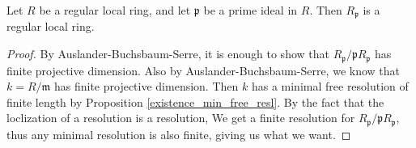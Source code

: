 \begin{theorem}

  \label{thm:regular_rings_localize}
  Let $R$ be a regular local ring, and let
  $\mathfrak{p}$ be a prime ideal in $R$.
  Then $R_{\mathfrak{p}}$ is a regular local ring.
\end{theorem}


\begin{proof}
  By Auslander-Buchsbaum-Serre, it is enough to show that 
  $R_{\mathfrak{p}} / \mathfrak{p}R_{\mathfrak{p}}$ has finite projective dimension.
  Also by Auslander-Buchsbaum-Serre, we know that 
  $k = R / \mathfrak{m}$ has finite projective dimension.
  Then $k$ has a minimal free resolution of finite length by
  Proposition \ref{existence_min_free_resl}.
  By the fact that the loclization of a resolution is a resolution,
  We get a finite resolution for 
  $R_{\mathfrak{p}} / \mathfrak{p}R_{\mathfrak{p}}$,
  thus any minimal resolution is also finite, giving us what we want.

\end{proof}
